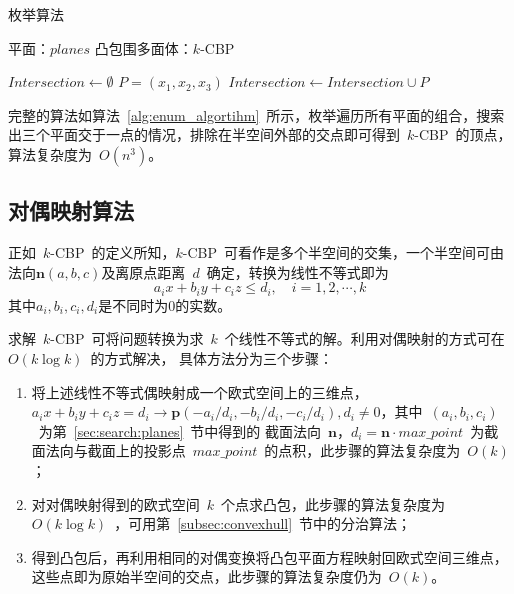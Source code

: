 \begin{algorithm}[htbp]
\small
\caption{枚举算法}
\label{alg:enum_algortihm}
\begin{algorithmic}[1]
\REQUIRE
平面：$planes$
\ENSURE
凸包围多面体：$k$-CBP

  \STATE $Intersection \gets \emptyset $
                    \STATE $P = (x_1, x_2, x_3)$
                      \STATE $Intersection \gets Intersection \cup P$
                    \ENDIF
                \ENDIF
            \ENDIF
        \ENDFOR
   \ENDFOR
   \ENDIF
\ENDFOR
{}
\end{algorithmic}
\end{algorithm}

完整的算法如算法~\ref{alg:enum_algortihm}~所示，枚举遍历所有平面的组合，搜索出三个平面交于一点的情况，排除在半空间外部的交点即可得到~$k$-CBP~的顶点，算法复杂度为~$O(n^3)$。

\subsection{对偶映射算法}
\label{subsec:intersection-dual-mapping}

正如~$k$-CBP~的定义所知，$k$-CBP~可看作是多个半空间的交集，一个半空间可由法向$\bm{n}(a,b,c)$及离原点距离~$d$~确定，转换为线性不等式即为
\begin{equation}
  \label{equa:halfspace:defition}
  a_ix+b_iy+c_iz \leq d_i, \quad i=1,2,\cdots,k
\end{equation}
其中$a_i,b_i,c_i,d_i$是不同时为0的实数。

求解~$k$-CBP~可将问题转换为求~$k$~个线性不等式的解。利用对偶映射的方式可在~$O(k \log k)$~的方式解决，
具体方法分为三个步骤\cite{Preparata1985Introduction}：
\begin{enumerate}[(1)]
\item   
将上述线性不等式偶映射成一个欧式空间上的三维点，
$a_ix+b_iy+c_iz=d_i \rightarrow \bm{p}(-a_i/d_i, -b_i/d_i,-c_i/d_i),d_i \neq 0$，其中~$(a_i,b_i,c_i)$~为第~\ref{sec:search:planes}~节中得到的
截面法向~$\bm{n}$，$d_i=\bm{n} \cdot
max\_point$~为截面法向与截面上的投影点~$max\_point$~的点积，此步骤的算法复杂度为~$O(k)$；
\item
  对对偶映射得到的欧式空间~$k$~个点求凸包，此步骤的算法复杂度为~$O(k\log k)$~，可用第~\ref{subsec:convexhull}~节中的分治算法；
\item
  得到凸包后，再利用相同的对偶变换将凸包平面方程映射回欧式空间三维点，这些点即为原始半空间的交点，此步骤的算法复杂度仍为~$O(k)$。
\end{enumerate}

